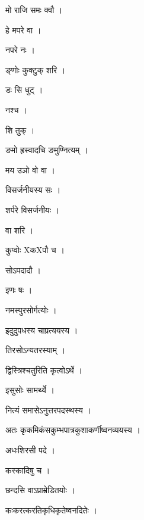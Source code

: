 \documentclass[10pt, openany]{book}
\begin{document}
\noindent मो राजि समः क्वौ ।

\noindent हे मपरे वा ।

\noindent नपरे नः ।

\noindent ङ्णोः कुक्टुक् शरि ।

\noindent डः सि धुट् ।

\noindent नश्च ।

\noindent शि तुक् ।

\noindent ङमो ह्रस्वादचि ङमुण्नित्यम् ।

\noindent मय उञो वो वा ।

\noindent विसर्जनीयस्य सः ।

\noindent शर्परे विसर्जनीयः ।

\noindent वा शरि ।

\noindent कुप्वोः XकXपौ च ।

\noindent सोऽपदादौ ।

\noindent इणः षः ।

\noindent नमस्पुरसोर्गत्योः ।

\noindent इदुदुपधस्य चाप्रत्ययस्य ।

\noindent तिरसोऽन्यतरस्याम् ।

\noindent द्विस्त्रिश्चतुरिति कृत्वोऽर्थे ।

\noindent इसुसोः सामर्थ्ये ।

\noindent नित्यं समासेऽनुत्तरपदस्थस्य ।

\noindent अतः कृकमिकंसकुम्भपात्रकुशाकर्णीष्वनव्ययस्य ।

\noindent अधःशिरसी पदे ।

\noindent कस्कादिषु च ।

\noindent छन्दसि वाऽप्राम्रेडितयोः ।

\noindent कःकरत्करतिकृधिकृतेष्वनदितेः ।
\end{document}
